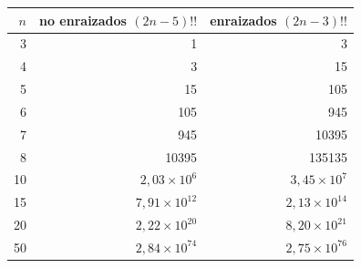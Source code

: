 \begin{tabular}{@{}rrr@{}}
\toprule
$n$ & no enraizados $(2n-5)!!$ & enraizados $(2n-3)!!$\\
\midrule
3 & \num{1} & \num{3}\\
4 & \num{3} & \num{15}\\
5 & \num{15} & \num{105}\\
6 & \num{105} & \num{945}\\
7 & \num{945} & \num{10395}\\
8 & \num{10395} & \num{135135}\\
10 & $2{,}03\times10^{6}$ & $3{,}45\times10^{7}$\\
15 & $7{,}91\times10^{12}$ & $2{,}13\times10^{14}$\\
20 & $2{,}22\times10^{20}$ & $8{,}20\times10^{21}$\\
50 & $2{,}84\times10^{74}$ & $2{,}75\times10^{76}$\\
\bottomrule
\end{tabular}
